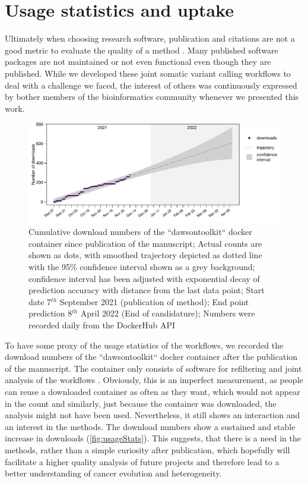 \section[Usage]{Usage statistics and uptake}
\label{variantcalling-sec:usage}
Ultimately when choosing research software, publication and citations are not a good metric to evaluate the quality of a method \cite{Gardner2022}. Many published software packages are not maintained or not even functional even though they are published. While we developed these joint somatic variant calling workflows to deal with a challenge we faced, the interest of others was continuously expressed by bother members of the bioinformatics community whenever we presented this work.

\begin{figure}[!ht]
\centering
\includegraphics[width=.99\linewidth]{Figures/jointVariantCalling/dawsontoolkitDownloads.pdf}
\caption[Usage statistics joint workflows]{Cumulative download numbers of the ``dawsontoolkit`` docker container since publication of the manuscript; Actual counts are shown as dots, with smoothed trajectory depicted as dotted line with the 95\% confidence interval shown as a grey background; confidence interval has been adjusted with exponential decay of prediction accuracy with distance from the last data point; Start date 7$^{th}$ September 2021 (publication of method); End point prediction 8$^{th}$ April 2022 (End of candidature); Numbers were recorded daily from the DockerHub API}\label{fig:usageStats}
\end{figure}

To have some proxy of the usage statistics of the workflows, we recorded the download numbers of the ``dawsontoolkit`` docker container after the publication of the manuscript. The container only consists of software for refiltering and joint analysis of the workflows . Obviously, this is an imperfect measurement, as people can reuse a downloaded container as often as they want, which would not appear in the count and similarly, just because the container was downloaded, the analysis might not have been used. Nevertheless, it still shows  an interaction and an interest in the methods. The download numbers show a sustained and stable increase in downloads (\autoref{fig:usageStats}). This suggests, that there is a need in the methods, rather than a simple curiosity after publication, which hopefully will facilitate a higher quality analysis of future projects and therefore lead to a better understanding of cancer evolution and heterogeneity.
